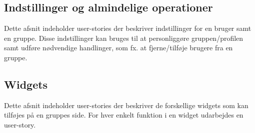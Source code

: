 

\subsection{Indstillinger og almindelige operationer}
Dette afsnit indeholder user-stories der beskriver indstillinger for en bruger samt en gruppe. Disse indstillinger kan bruges til at personliggøre gruppen/profilen samt udføre nødvendige handlinger, som fx. at fjerne/tilføje brugere fra en gruppe.


\newpage
\subsection{Widgets}
Dette afsnit indeholder user-stories der beskriver de forskellige widgets som kan tilføjes på en gruppes side. For hver enkelt funktion i en widget udarbejdes en user-story. 






